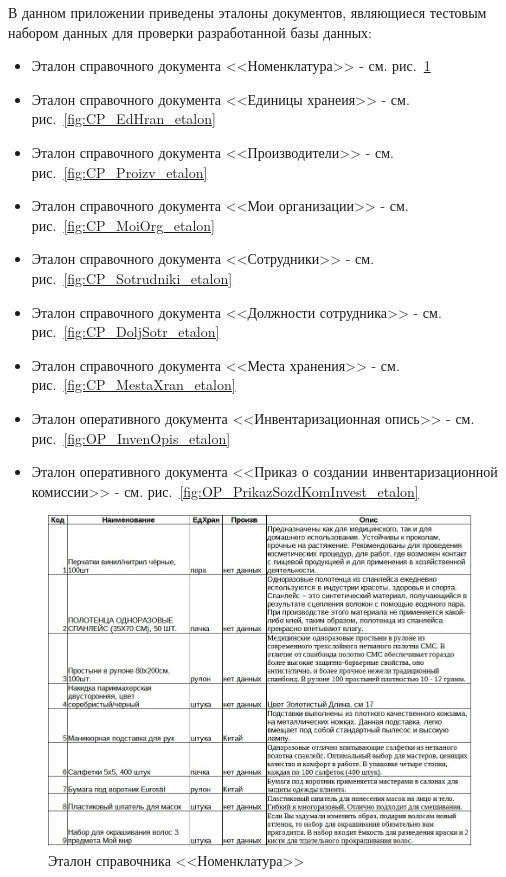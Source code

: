 \documentclass[12pt, a4paper, simple]{eskdtext}
\begin{document}
    

    \thispagestyle{plain}
    \pagestyle{plain}
    \hspace{0pt}

    В данном приложении приведены эталоны документов,
    являющиеся тестовым набором данных для проверки разработанной базы данных:

    \begin{itemize}
        \item Эталон справочного документа <<Номенклатура>> - см. рис.~\ref{fig:CP_Nomenclatura_etalon}
        \item Эталон справочного документа <<Единицы хранеия>> - см. рис.~\ref{fig:CP_EdHran_etalon}
        \item Эталон справочного документа <<Производители>> - см. рис.~\ref{fig:CP_Proizv_etalon}
        \item Эталон справочного документа <<Мои организации>> - см. рис.~\ref{fig:CP_MoiOrg_etalon}
        \item Эталон справочного документа <<Сотрудники>> - см. рис.~\ref{fig:CP_Sotrudniki_etalon}
        \item Эталон справочного документа <<Должности сотрудника>> - см. рис.~\ref{fig:CP_DoljSotr_etalon}
        \item Эталон справочного документа <<Места хранения>> - см. рис.~\ref{fig:CP_MestaXran_etalon}
        \item Эталон оперативного документа <<Инвентаризационная опись>> - см. рис.~\ref{fig:OP_InvenOpis_etalon}
        \item Эталон оперативного документа <<Приказ о создании инвентаризационной комиссии>> - см. рис.~\ref{fig:OP_PrikazSozdKomInvest_etalon}
    \end{itemize}

    \begin{figure}[!h]
        \centering
        \includegraphics[width=18cm]
            {_docs/СП_Номенкл_эталон.jpg}
        \caption{Эталон справочника <<Номенклатура>>}
        \label{fig:CP_Nomenclatura_etalon}
    \end{figure}
    
\end{document}
